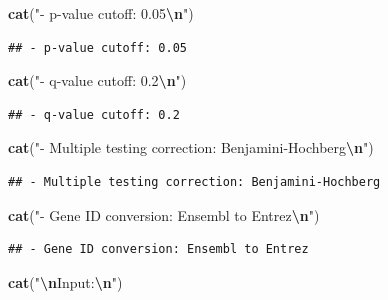 \documentclass[
]{article}
\newenvironment{Shaded}{\begin{snugshade}}{\end{snugshade}}
\newcommand{\FunctionTok}[1]{\textcolor[rgb]{0.13,0.29,0.53}{\textbf{#1}}}
\newcommand{\NormalTok}[1]{#1}
\newcommand{\SpecialCharTok}[1]{\textcolor[rgb]{0.81,0.36,0.00}{\textbf{#1}}}
\newcommand{\StringTok}[1]{\textcolor[rgb]{0.31,0.60,0.02}{#1}}
\begin{document}
\begin{Shaded}
\begin{Highlighting}[]
\FunctionTok{cat}\NormalTok{(}\StringTok{"{-} p{-}value cutoff: 0.05}\SpecialCharTok{\textbackslash{}n}\StringTok{"}\NormalTok{)}
\end{Highlighting}
\end{Shaded}

\begin{verbatim}
## - p-value cutoff: 0.05
\end{verbatim}

\begin{Shaded}
\begin{Highlighting}[]
\FunctionTok{cat}\NormalTok{(}\StringTok{"{-} q{-}value cutoff: 0.2}\SpecialCharTok{\textbackslash{}n}\StringTok{"}\NormalTok{) }
\end{Highlighting}
\end{Shaded}

\begin{verbatim}
## - q-value cutoff: 0.2
\end{verbatim}

\begin{Shaded}
\begin{Highlighting}[]
\FunctionTok{cat}\NormalTok{(}\StringTok{"{-} Multiple testing correction: Benjamini{-}Hochberg}\SpecialCharTok{\textbackslash{}n}\StringTok{"}\NormalTok{)}
\end{Highlighting}
\end{Shaded}

\begin{verbatim}
## - Multiple testing correction: Benjamini-Hochberg
\end{verbatim}

\begin{Shaded}
\begin{Highlighting}[]
\FunctionTok{cat}\NormalTok{(}\StringTok{"{-} Gene ID conversion: Ensembl to Entrez}\SpecialCharTok{\textbackslash{}n}\StringTok{"}\NormalTok{)}
\end{Highlighting}
\end{Shaded}

\begin{verbatim}
## - Gene ID conversion: Ensembl to Entrez
\end{verbatim}

\begin{Shaded}
\begin{Highlighting}[]
\FunctionTok{cat}\NormalTok{(}\StringTok{"}\SpecialCharTok{\textbackslash{}n}\StringTok{Input:}\SpecialCharTok{\textbackslash{}n}\StringTok{"}\NormalTok{)}
\end{Highlighting}
\end{Shaded}
\end{document}
